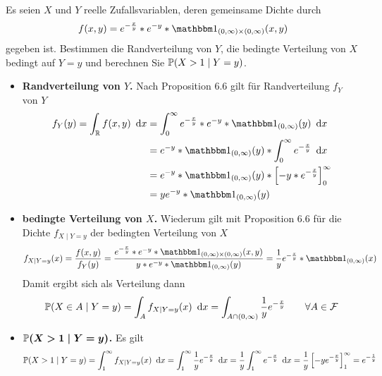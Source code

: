 \begin{exercisePage}
	
	\begin{homework}
		Es seien $X$ und $Y$ reelle Zufallsvariablen, deren gemeinsame Dichte durch
		\begin{equation*}
			f(x,y) = e^{-\frac{x}{y}} * e^{-y} * \one_{(0,\infty) \times (0,\infty)}(x,y)
		\end{equation*}
		gegeben ist. Bestimmen die Randverteilung von $Y$, die bedingte Verteilung von $X$ bedingt auf $Y = y$ und berechnen Sie $\P(X > 1 \mid Y = y)$.
	\end{homework}	
	
	\begin{itemize}[leftmargin=*]
		\item \textbf{Randverteilung von $Y$.} Nach Proposition 6.6 gilt für Randverteilung $f_Y$ von $Y$
		\begin{equation*}
		\begin{aligned}
			f_Y(y) = \int_\R f(x,y) \dx 
			&= \int_0^\infty e^{-\frac{x}{y}} * e^{-y} * \one_{(0,\infty)}(y) \dx \\
			&= e^{-y} * \one_{(0,\infty)}(y) * \int_0^\infty e^{-\frac{x}{y}} \dx \\
			&= e^{-y} * \one_{(0,\infty)}(y) * \left[ -y * e^{- \frac{x}{y}}  \right]_0^\infty\\
			&= y e^{-y} * \one_{(0,\infty)}(y)\\
		\end{aligned}
		\end{equation*}	
		
		\item \textbf{bedingte Verteilung von $X$.} Wiederum gilt mit Proposition 6.6 für die Dichte $f_{X \mid Y = y}$ der bedingten Verteilung von $X$
		\begin{equation*}
			f_{X \mid Y = y}(x) = \frac{f(x,y)}{f_Y(y)} 
			= \frac{e^{-\frac{x}{y}}*e^{-y} * \one_{(0,\infty)\times (0, \infty)}(x,y)}{y * e^{-y} * \one_{(0,\infty)}(y)} 
			= \frac{1}{y} e^{-\frac{x}{y}} * \one_{(0,\infty)}(x)
		\end{equation*}
		Damit ergibt sich als Verteilung dann
		\begin{equation*}
			\P(X \in A \mid Y = y) = \int_A f_{X \mid Y = y}(x) \dx = \int_{A \cap (0,\infty)} \frac{1}{y} e^{-\frac{x}{y}} \qquad \forall A \in \ereignisF
		\end{equation*}
		
		\item \textbf{$\boldsymbol{\P(X>1 \mid Y = y)}$.} Es gilt
		\begin{equation*}
		\begin{aligned}
			\P(X > 1 \mid Y =  y) = \int_1^\infty f_{X \mid Y = y}(x) \dx = \int_1^\infty \frac{1}{y} e^{-\frac{x}{y}} \dx = \frac{1}{y} \int_1^\infty e^{-\frac{x}{y}} \dx = \frac{1}{y} \left[ -y e^{- \frac{x}{y}} \right]_1^\infty = e^{-\frac{1}{y}}
		\end{aligned}
		\end{equation*}
	\end{itemize}



\end{exercisePage}
